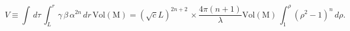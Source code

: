 \begin{equation}
V\equiv \int \,d\tau \,\int_L^{r}\gamma \,\beta \,\alpha^{2n} \, dr \,
\mathrm{Vol(M)}=(\sqrt{c}L)^{2n+2}\,\times
\frac{4\pi(n+1)}{\lambda}\mathrm{Vol(M)}\,\int_1^{\rho} (\rho^2-1)^n\,
d\rho .
\end{equation}


